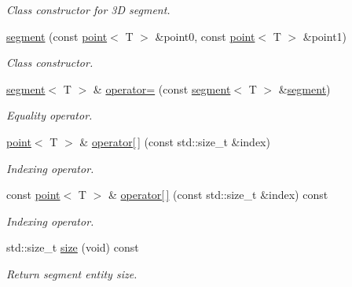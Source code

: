 \begin{DoxyCompactItemize}
\begin{DoxyCompactList}\small\item\em Class constructor for 3D segment. \end{DoxyCompactList}\item 
\hyperlink{classddd_1_1segment_afdfcc983efc30b3dee0af2603795775b}{segment} (const \hyperlink{classddd_1_1point}{point}$<$ T $>$ \&point0, const \hyperlink{classddd_1_1point}{point}$<$ T $>$ \&point1)
\begin{DoxyCompactList}\small\item\em Class constructor. \end{DoxyCompactList}\item 
\hyperlink{classddd_1_1segment}{segment}$<$ T $>$ \& \hyperlink{classddd_1_1segment_a9c33e619d61ee3fc61a7767ebc2948f5}{operator=} (const \hyperlink{classddd_1_1segment}{segment}$<$ T $>$ \&\hyperlink{classddd_1_1segment}{segment})
\begin{DoxyCompactList}\small\item\em Equality operator. \end{DoxyCompactList}\item 
\hyperlink{classddd_1_1point}{point}$<$ T $>$ \& \hyperlink{classddd_1_1segment_a38fb73f1bb682c0446eef1cce0cb5f21}{operator\mbox{[}$\,$\mbox{]}} (const std\+::size\+\_\+t \&index)
\begin{DoxyCompactList}\small\item\em Indexing operator. \end{DoxyCompactList}\item 
const \hyperlink{classddd_1_1point}{point}$<$ T $>$ \& \hyperlink{classddd_1_1segment_a7f491fcefb2c3d8f805b7a27ed93395f}{operator\mbox{[}$\,$\mbox{]}} (const std\+::size\+\_\+t \&index) const
\begin{DoxyCompactList}\small\item\em Indexing operator. \end{DoxyCompactList}\item 
\mbox{\label{classddd_1_1segment_a4337f5736c0e63ff90f4ecf69131d648}} 
std\+::size\+\_\+t \hyperlink{classddd_1_1segment_a4337f5736c0e63ff90f4ecf69131d648}{size} (void) const
\begin{DoxyCompactList}\small\item\em Return segment entity size. \end{DoxyCompactList}\item 
\mbox{\label{classddd_1_1segment_ab49787592f80cedf871adf00d3e54f76}} 

\end{DoxyCompactItemize}
